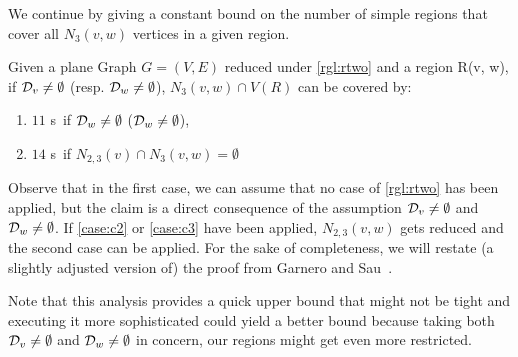We continue by giving a constant bound on the number of simple regions that cover all  $N_3(v,w)$ vertices in a given region.

\begin{lemma}\label{lemma:rtwosr}
    Given a plane Graph $G = (V,E)$ reduced under \cref{rgl:rtwo}  and a region R(v, w), if $\mathcal{D}_{v} \neq \emptyset $ (resp. $\mathcal{D}_{w} \neq \emptyset$), $N_3(v,w) \cap V(R)$ can be covered by: 
    \begin{enumerate}
        \item $11$ \sr s~if $\mathcal{D}_{w} \neq \emptyset$ ($\mathcal{D}_{w} \neq \emptyset$),
        \item $14$ \sr s~if $N_{2,3}(v) \cap N_3(v,w) = \emptyset$
    \end{enumerate}
\end{lemma}

Observe that in the first case, we can assume that no case of \cref{rgl:rtwo} has been applied, but the claim is a direct consequence of the assumption $\mathcal{D}_{v} \neq \emptyset$ and $\mathcal{D}_{w} \neq \emptyset$. If \cref{case:c2} or \cref{case:c3} have been applied, $N_{2,3}(v,w)$ gets reduced and the second case can be applied. For the sake of completeness, we will restate (a slightly adjusted version of) the proof from Garnero and Sau~\cite[Fact 6, arXiv v2]{Garnero2018}. 

Note that this analysis provides a quick upper bound that might not be tight and executing it more sophisticated could yield a better bound because taking both $\mathcal{D}_{v} \neq \emptyset$ and $\mathcal{D}_{w} \neq \emptyset$ in concern, our regions might get even more restricted.

